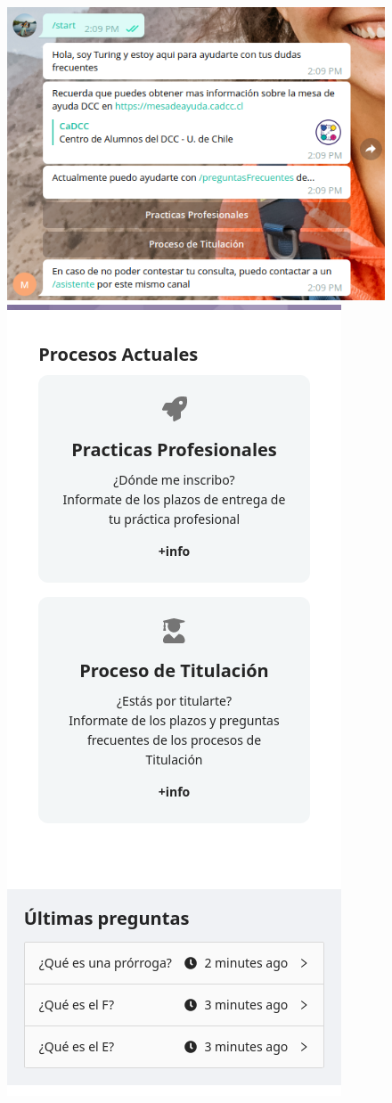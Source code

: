     \begin{figure}[h]
        \centering
        \includegraphics[scale=0.3]{media/imagenes/sc/inicio_bot.png}
        \includegraphics[scale=0.3]{media/imagenes/sc/mesa-de-ayuda-front-mobile-recorte.png}

\end{figure}

